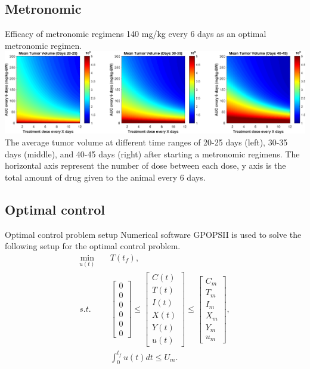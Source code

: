 \documentclass[10pt]{beamer}
\begin{document}
\subsection{Metronomic}
\begin{frame}{Efficacy of metronomic regimens}
	140 mg/kg every 6 days as an optimal metronomic regimen. \\ \vspace{0.5cm}
	\includegraphics[width=1\linewidth]{chemo-metronomic.png} \\
	\vspace{0.5cm}
	The average tumor volume at different time ranges of 20-25 days (left), 30-35 days (middle), and 40-45 days (right) after starting a metronomic regimens. The horizontal axis represent the number of dose between each dose, y axis is the total amount of drug given to the animal every 6 days.
\end{frame}

\subsection{Optimal control}
\begin{frame}{Optimal control problem setup}
	Numerical software GPOPS\textunderscore II is used to solve the following setup for the optimal control problem.\\
	\begin{subequations}
	\begin{align}  \label{eq:ocp}
			\min_{u(t)} & \quad T(t_f), \\
			s.t. & \quad 
			\begin{bmatrix}
				0 \\ 0 \\ 0 \\ 0 \\ 0 \\ 0
			\end{bmatrix} 
			\leq
			\begin{bmatrix}
				C(t) \\ T(t) \\ I(t) \\ X(t) \\ Y(t) \\ u(t)
			\end{bmatrix}
			\leq
			\begin{bmatrix}
				C_m \\ T_m \\ I_m \\ X_m \\ Y_m \\ u_m
			\end{bmatrix},
			\\
			& \quad \int_0^{t_f} u(t) dt \leq U_m.
	\end{align}
	\end{subequations}
\end{frame}
\end{document}
